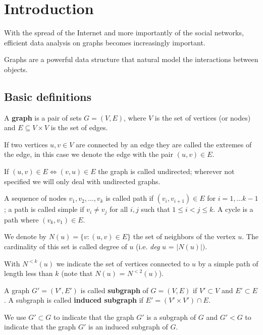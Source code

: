 \chapter{Introduction}

With the spread of the Internet and more importantly of the social networks, efficient data analysis on graphs becomes increasingly important. 

Graphs are a powerful data structure that natural model the interactions between objects.

\section{Basic definitions}

\begin{definizione}\label{def:graph}
	A \textbf{graph} is a pair of sets $G=(V,E)$, where $V$ is the set of vertices (or nodes) and $E \subseteq V \times V$ is the set of edges.
\end{definizione}

If two vertices $u, v \in V$ are connected by an edge they are called the extremes of the edge, in this case we denote the edge with the pair $(u, v) \in E$.

If $(u,v) \in E \Leftrightarrow (v,u) \in E$ the graph is called undirected; wherever not specified we will only deal with undirected graphs.

A sequence of nodes  $v_{1}, v_{2}, \ldots, v_{k}$ is called path if $(v_{i}, v_{i+1}) \in E$ for $i = 1, \ldots k-1$; a path is called simple if $v_{i} \neq v_{j}$ for all $i,j$ such that $1 \leq i < j \leq k$. A cycle is a path where $(v_{k}, v_{1}) \in E$.

We denote by $N(u) = \{ v : (u,v) \in E \}$ the set of neighbors of the vertex $u$. The cardinality of this set is called degree of $u$ (i.e. \textit{deg} $u$ = $|N(u)|)$. 

With $N^{<k}(u)$ we indicate the set of vertices connected to $u$ by a simple path of length less than $k$ (note that $N(u)$ = $N^{<2}(u)$).

\begin{definizione}\label{def:subgraph}
	A graph $G' = (V', E')$ is called \textbf{subgraph} of $G=(V,E)$ if $V' \subset V$ and $E' \subset E$. A subgraph is called \textbf{induced subgraph} if $E' = (V' \times V') \cap E$.
\end{definizione}

We use $G' \subset G$ to indicate that the graph $G'$ is a subgraph of $G$ and $G' < G$ to indicate that the graph $G'$ is an induced subgraph of $G$.\medskip

